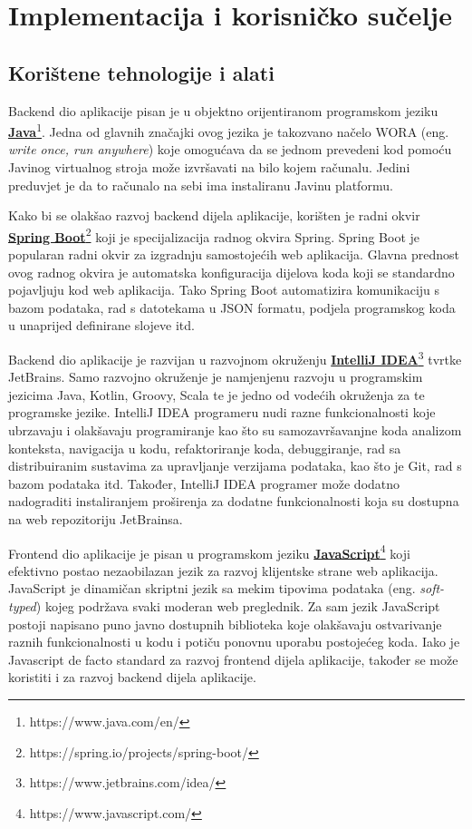 \chapter{Implementacija i korisničko sučelje}
		
		
		\section{Korištene tehnologije i alati}
			
			Backend dio aplikacije pisan je u objektno orijentiranom programskom jeziku  \href{https://www.java.com/en/}{\textbf{Java}}\footnote{https://www.java.com/en/}. Jedna od glavnih značajki ovog jezika je takozvano načelo WORA (eng. \textit{write once, run anywhere}) koje omogućava da se jednom prevedeni kod pomoću Javinog virtualnog stroja može izvršavati na bilo kojem računalu. Jedini preduvjet je da to računalo na sebi ima instaliranu Javinu platformu.
			
			Kako bi se olakšao razvoj backend dijela aplikacije, korišten je radni okvir \href{https://spring.io/projects/spring-boot/}{\textbf{Spring Boot}}\footnote{https://spring.io/projects/spring-boot/} koji je specijalizacija radnog okvira Spring. Spring Boot je popularan radni okvir za izgradnju samostojećih web aplikacija. Glavna prednost ovog radnog okvira je automatska konfiguracija dijelova koda koji se standardno pojavljuju kod web aplikacija. Tako Spring Boot automatizira komunikaciju s bazom podataka, rad s datotekama u JSON formatu, podjela programskog koda u unaprijed definirane slojeve itd.
			
			Backend dio aplikacije je razvijan u razvojnom okruženju \href{https://www.jetbrains.com/idea/}{\textbf{IntelliJ IDEA}}\footnote{https://www.jetbrains.com/idea/} tvrtke JetBrains. Samo razvojno okruženje je namjenjenu razvoju u programskim jezicima Java, Kotlin, Groovy, Scala te je jedno od vodećih okruženja za te programske jezike. IntelliJ IDEA programeru nudi razne funkcionalnosti koje ubrzavaju i olakšavaju programiranje kao što su samozavršavanjne koda analizom konteksta, navigacija u kodu, refaktoriranje koda, debuggiranje, rad sa distribuiranim sustavima za upravljanje verzijama podataka, kao što je Git, rad s bazom podataka itd. Također, IntelliJ IDEA programer može dodatno nadograditi instaliranjem proširenja za dodatne funkcionalnosti koja su dostupna na web repozitoriju JetBrainsa.
			
			Frontend dio aplikacije je pisan u programskom jeziku \href{https://www.javascript.com/}{\textbf{JavaScript}}\footnote{https://www.javascript.com/} koji efektivno postao nezaobilazan jezik za razvoj klijentske strane web aplikacija. JavaScript je dinamičan skriptni jezik sa mekim tipovima podataka (eng. \textit{soft-typed}) kojeg podržava svaki moderan web preglednik. Za sam jezik JavaScript postoji napisano puno javno dostupnih biblioteka koje olakšavaju ostvarivanje raznih funkcionalnosti u kodu i potiču ponovnu uporabu postojećeg koda. Iako je Javascript de facto standard za razvoj frontend dijela aplikacije, također se može koristiti i za razvoj backend dijela aplikacije.
			
